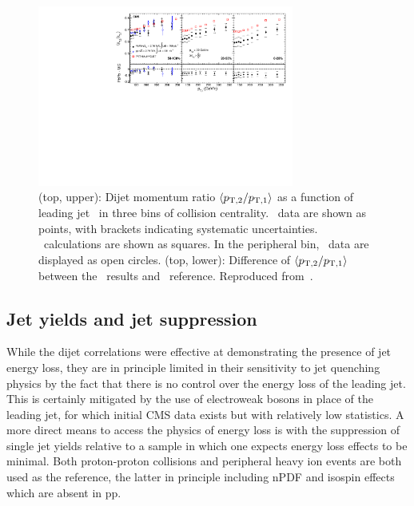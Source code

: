 \begin{figure}[!th]
\begin{center}
\includegraphics[width=0.75\textwidth]{jetfigures/deltaPtOverPt5_lead120_sub30_diff_20120103.pdf}
\caption{
(top, upper): Dijet momentum ratio $\langle p_{\rm{T},2}/p_{\rm{T},1} \rangle$ as a function of
leading jet \pT\ in three bins of collision centrality.
\PbPb\ data are shown as points, with brackets indicating systematic uncertainties.  
\PYTHYD\ calculations are shown as squares. In the peripheral bin,
\pp\ data are displayed as open circles.
(top, lower): Difference of $\langle p_{\rm{T},2}/p_{\rm{T},1} \rangle$ between the \PbPb\ results and \PYTHYD\ reference.
Reproduced from~\cite{CMS_dijet}.
}
\label{fig:PAS:CMS_pt_ratio}
\end{center}
\end{figure}


\subsection{Jet yields and jet suppression}

While the dijet correlations were effective at demonstrating the presence of jet energy loss, 
they are in principle limited in their sensitivity to jet quenching physics by the fact that
there is no control over the energy loss of the leading jet.
This is certainly mitigated by the use of electroweak bosons in place of the leading jet,
for which initial CMS data exists but with relatively low statistics.
A more direct means to access the physics of energy loss is with the suppression of single
jet yields relative to a sample in which one expects energy loss effects to be minimal.
Both proton-proton collisions and peripheral heavy ion events are both used as the reference,
the latter in principle including nPDF and isospin effects which are absent in pp.


